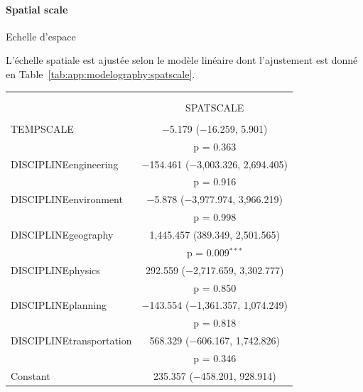 \paragraph{Spatial scale}{Echelle d'espace}


L'échelle spatiale est ajustée selon le modèle linéaire dont l'ajustement est donné en Table~\ref{tab:app:modelography:spatscale}.



\begin{table}%
\begin{tabular}{@{\extracolsep{5pt}}lc} 
\\[-1.8ex]\hline 
\hline \\[-1.8ex] 
\\[-1.8ex] & SPATSCALE \\ 
\hline \\[-1.8ex] 
 TEMPSCALE & $-$5.179 ($-$16.259, 5.901) \\ 
  & p = 0.363 \\ 
  DISCIPLINEengineering & $-$154.461 ($-$3,003.326, 2,694.405) \\ 
  & p = 0.916 \\ 
  DISCIPLINEenvironment & $-$5.878 ($-$3,977.974, 3,966.219) \\ 
  & p = 0.998 \\ 
  DISCIPLINEgeography & 1,445.457 (389.349, 2,501.565) \\ 
  & p = 0.009$^{***}$ \\ 
  DISCIPLINEphysics & 292.559 ($-$2,717.659, 3,302.777) \\ 
  & p = 0.850 \\ 
  DISCIPLINEplanning & $-$143.554 ($-$1,361.357, 1,074.249) \\ 
  & p = 0.818 \\ 
  DISCIPLINEtransportation & 568.329 ($-$606.167, 1,742.826) \\ 
  & p = 0.346 \\ 
  Constant & 235.357 ($-$458.201, 928.914) \\ 

\end{tabular}
\end{table}
